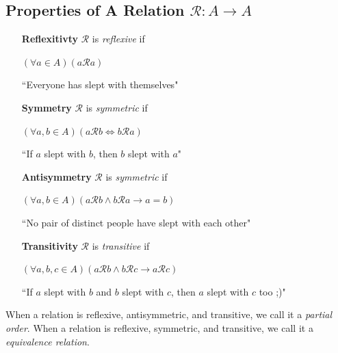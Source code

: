 \documentclass{article}
\begin{document}
\subsection*{Properties of A Relation $\mathcal{R} \colon A \rightarrow A$}

    \begin{enumerate}[align=left]
        \item [\textbf{Reflexitivty}] $\mathcal{R}$ is \textit{reflexive} if 

        $(\forall a \in A)(a\mathcal{R}a)$

        ``Everyone has slept with themselves"
        \item [\textbf{Symmetry}] $\mathcal{R}$ is \textit{symmetric} if 

        $(\forall a, b \in A)(a\mathcal{R}b \iff b\mathcal{R}a)$

        ``If $a$ slept with $b$, then $b$ slept with $a$"

        \item [\textbf{Antisymmetry}] $\mathcal{R}$ is \textit{symmetric} if 

        $(\forall a, b\in A)(a\mathcal{R}b \wedge b\mathcal{R}a \rightarrow a=b)$

        ``No pair of distinct people have slept with each other"

        \item [\textbf{Transitivity}] $\mathcal{R}$ is \textit{transitive} if 

        $(\forall a, b, c\in A)(a\mathcal{R}b \wedge b\mathcal{R}c \rightarrow a\mathcal{R}c)$

        ``If $a$ slept with $b$ and $b$ slept with $c$, then $a$ slept with $c$ too ;)"
    \end{enumerate}

    When a relation is reflexive, antisymmetric, and transitive, we call it a \textit{partial order}. When a relation is reflexive, symmetric, and transitive, we call it a \textit{equivalence relation}.
\end{document}
